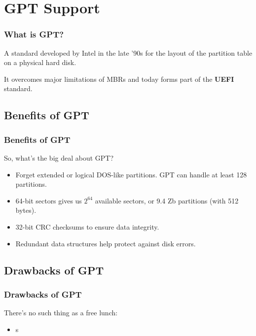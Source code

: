 
\section{GPT Support}
\begin{frame}\frametitle{What is GPT?}
  A standard developed by Intel in the late '90s for the layout of the partition table on a physical hard disk.\newline

  It overcomes major limitations of MBRs and today forms part of the \textbf{UEFI} standard.
\end{frame}

\subsection{Benefits of GPT}
\begin{frame}\frametitle{Benefits of GPT}
  So, what's the big deal about GPT?
  \begin{itemize}
  \item Forget extended or logical DOS-like partitions. GPT can handle at least 128 partitions.
  \item 64-bit sectors gives us $2^{64}$ available sectors, or 9.4 Zb partitions (with 512 bytes).
  \item 32-bit CRC checksums to ensure data integrity.
  \item Redundant data structures help protect against disk errors.
  \end{itemize}
\end{frame}

\subsection{Drawbacks of GPT}
\begin{frame}\frametitle{Drawbacks of GPT}
  There's no such thing as a free lunch:
  \begin{itemize}
    \item s
  \end{itemize}
\end{frame}
